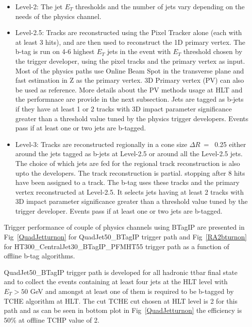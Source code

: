 \begin{itemize}
\item Level-2: The jet $E_T$ thresholds and the number of jets vary
  depending on the needs of the physics channel.
\item Level-2.5: Tracks are reconstructed using the Pixel Tracker
  alone (each with at least 3 hits), and are then used to reconstruct
  the 1D primary vertex. The b-tag is run on 4-6 highest $E_T$ jets in
  the event with $E_T$ threshold chosen by the trigger developer,
  using the pixel tracks and the primary vertex as input. Most of the
  physics paths use Online Beam Spot in the transverse plane and fast
  estimation in Z as the primary vertex. 3D Primary vertex (PV) can also be
  used as reference. More details about the PV methods usage at HLT
  and the performnace are provide in the next subsection. Jets are
  tagged as b-jets if they have at least 1 or 2 tracks with 3D impact
  parameter significance greater than a threshold value tuned by the
  physics trigger developers. Events pass if at least one or two
  jets are b-tagged.
\item Level-3: Tracks are reconstructed regionally in a cone size
  $\Delta R~=~$ 0.25 either around the jets tagged as b-jets at
  Level-2.5 or around all the Level-2.5 jets. The choice of which jets
  are fed for the regional track reconstruction is also upto the
  developers. The track reconstruction is partial. stopping after 
  8 hits have been assigned to a track. The b-tag uses these tracks
  and the primary vertex reconstructed at Level-2.5. It selects jets
  having at least 2 tracks with 3D impact parameter significance
  greater than a threshold value tuned by the trigger
  developer. Events pass if at least one or two jets are b-tagged.
\end{itemize}

Trigger performance of couple of physics channels using BTagIP are
presented in Fig~\ref{QuadJetturnon} for QuadJet50\_BTagIP trigger path
and Fig~\ref{RA2bturnon} for HT300\_CentralJet30\_BTagIP\_PFMHT55
trigger path as a function of offline b-tag algorithms. 

QuadJet50\_BTagIP trigger path is developed for all hadronic ttbar
final state and to collect the events containing at least four jets at the HLT level with $E_T > 50$ GeV and
amongst at least one of them is required to be b-tagged by TCHE
algorithm at HLT. The cut TCHE cut chosen at HLT level is 2 for this
path and as can be seen in bottom plot in Fig~\ref{QuadJetturnon} the
efficiency is 50\% at offline TCHP value of 2.


